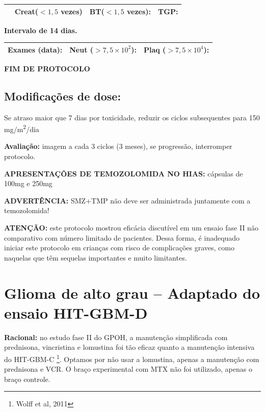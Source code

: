 \documentclass[11pt,a4paper,oldfontcommands]{memoir}
\begin{document}
\begin{center}
\begin{table}[H]
\begin{tabular}{p{1cm}p{5cm}|p{1cm}|p{4.5cm}|p{2cm}}
    \cline{2-5}
    \multicolumn{1}{c|}{\multirow{2}{*}{{}}}&\multicolumn{2}{l|}{Creat(\(<1,5\) vezes)}&{BT(\(<1,5\) vezes):}&{TGP:}
    \\
    \hline
\end{tabular}
\end{table}
\textbf{Intervalo de 14 dias.}
\begin{table}[H]
\begin{tabular}{p{5cm}|p{5cm}|p{4.7cm}}
    \hline
    \textbf{Exames (data):}&{Neut (\(>7,5\times10^2\)):}&{Plaq (\(>7,5\times10^4\)):}
    \\
    \hline
\end{tabular}
\end{table}

\textbf{FIM DE PROTOCOLO}

\end{center}
\subsection{Modificações de dose:}
Se atraso maior que 7 dias por toxicidade, reduzir os ciclos subsequentes para 150 mg/m\textsuperscript{2}/dia

\textbf{Avaliação:} imagem a cada 3 ciclos (3 meses), se progressão, interromper protocolo.

\textbf{APRESENTAÇÕES DE TEMOZOLOMIDA NO HIAS:} cápsulas de 100mg e 250mg

\textbf{ADVERTÊNCIA:} SMZ+TMP não deve ser administrada juntamente com a temozolomida!

\textbf{ATENÇÃO:} este protocolo mostrou eficácia discutível em um ensaio fase II não comparativo com número limitado de pacientes. Dessa forma, é inadequado iniciar este protocolo em crianças com risco de complicações graves, como naquelas que têm sequelas importantes e muito limitantes.
\cleardoublepage
\section{Glioma de alto grau -- Adaptado do ensaio HIT-GBM-D}
{\let\thefootnote\relax{}}

\textbf{Racional:} no estudo fase II do GPOH, a manutenção simplificada com prednisona, vincristina e lomustina foi tão eficaz quanto a manutenção intensiva do HIT-GBM-C \footnote{Wolff et al, 2011}. Optamos por não usar a lomustina, apenas a manutenção com prednisona e VCR. O braço experimental com MTX não foi utilizado, apenas o braço controle.
\end{document}
